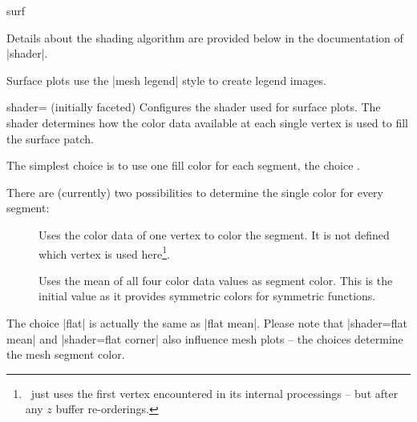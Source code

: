 {\begin{plottype}[/pgfplots]{surf}
\pgfplotsexpensiveexample
\begin{codeexample}[]
\end{codeexample}

	Details about the shading algorithm are provided below in the documentation of |shader|.

	Surface plots use the |mesh legend| style to create legend images.
\end{plottype}

\begin{pgfplotskey}{shader= (initially faceted)}
	Configures the shader used for surface plots. The shader determines how the color data available at each single vertex is used to fill the surface patch.

	The simplest choice is to use one fill color for each segment, the choice .

\pgfplotsexpensiveexample
\begin{codeexample}[]
\end{codeexample}

	\noindent There are (currently) two possibilities to determine the single color for every segment:
	\begin{description}
		\item[] Uses the color data of one vertex to color the segment. It is not defined which vertex is used here\footnote{\PGFPlots\ just uses the first vertex encountered in its internal processings -- but after any $z$ buffer re-orderings.}.

		\item[] Uses the mean of all four color data values as segment color. This is the initial value as it provides symmetric colors for symmetric functions.
	\end{description}
	The choice |flat| is actually the same as |flat mean|. Please note that |shader=flat mean| and |shader=flat corner| also influence mesh plots -- the choices determine the mesh segment color.


\end{pgfplotskey}}
